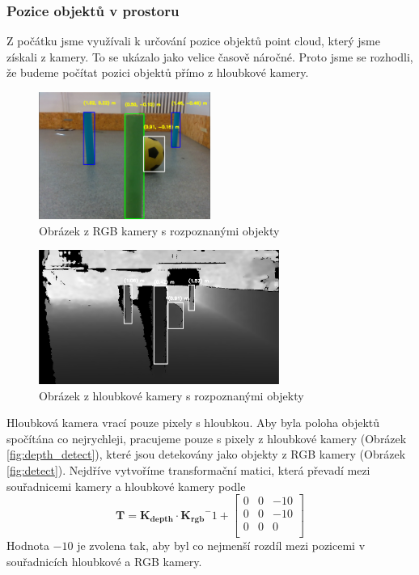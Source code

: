 \documentclass[a4paper,12pt]{article}
\begin{document}
\subsubsection{Pozice objektů v prostoru}
\label{sec:point_cloud}
Z počátku jsme využívali k určování pozice objektů point cloud, který jsme získali z kamery.
To se ukázalo jako velice časově náročné. Proto jsme se rozhodli, že budeme počítat pozici objektů přímo z hloubkové kamery.
\begin{figure}[H]
    \centering
    \includegraphics[width=0.5\textwidth]{pictures/detect.png}
    \caption{Obrázek z RGB kamery s rozpoznanými objekty}
    \label{fig:detect}
\end{figure}
\begin{figure}[H]
    \centering
    \includegraphics[width=0.7\textwidth]{pictures/depth_detect.png}
    \caption{Obrázek z hloubkové kamery s rozpoznanými objekty}
    \label{fig:depth_detect}
\end{figure}
Hloubková kamera vrací pouze pixely s hloubkou. Aby byla poloha objektů spočítána co nejrychleji, pracujeme pouze s pixely z hloubkové kamery (Obrázek \eqref{fig:depth_detect}), které jsou detekovány jako objekty z RGB kamery (Obrázek \eqref{fig:detect}).
Nejdříve vytvoříme transformační matici, která převadí mezi souřadnicemi kamery a hloubkové kamery podle 
\begin{equation}
    \mathbf T = \mathbf{K_{depth}} \cdot \mathbf{K_{rgb}}^-1 + \begin{bmatrix}
        0 & 0 & -10\\
        0 & 0 & -10\\
        0 & 0 & 0\\
    \end{bmatrix}
\end{equation}
Hodnota $-10$ je zvolena tak, aby byl co nejmenší rozdíl mezi pozicemi v souřadnicích hloubkové a RGB kamery.
\end{document}
